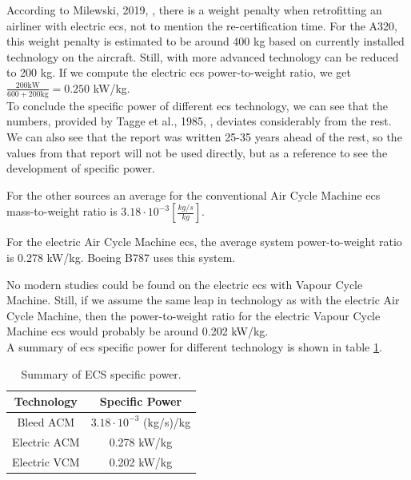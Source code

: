 \documentclass[english]{kththesis}
\begin{document}
According to Milewski, 2019, \cite{D.M.N.Milewski2019}, there is a weight penalty when retrofitting an airliner with electric \acrshort{ecs}, not to mention the re-certification time. For the A320, this weight penalty is estimated to be around 400 kg based on currently installed technology on the aircraft. Still, with more advanced technology can be reduced to 200 kg. If we compute the electric \acrshort{ecs} power-to-weight ratio, we get $\frac{200 \text{kW}}{600+200 \text{kg}}= 0.250$ kW/kg.\\

To conclude the specific power of different \acrshort{ecs} technology, we can see that the numbers, provided by Tagge et al., 1985, \cite{Tagge1985}, deviates considerably from the rest. We can also see that the report was written 25-35 years ahead of the rest, so the values from that report will not be used directly, but as a reference to see the development of specific power.

For the other sources an average for the conventional Air Cycle Machine \acrshort{ecs} mass-to-weight ratio is $3.18 \cdot 10 ^{-3} \left[\frac{kg/s}{kg}\right]$.

For the electric Air Cycle Machine \acrshort{ecs}, the average system power-to-weight ratio is 0.278 kW/kg. Boeing B787 uses this system.

No modern studies could be found on the electric \acrshort{ecs} with Vapour Cycle Machine. Still, if we assume the same leap in technology as with the electric Air Cycle Machine, then the power-to-weight ratio for the electric Vapour Cycle Machine \acrshort{ecs} would probably be around 0.202 kW/kg.\\

A summary of \acrshort{ecs} specific power for different technology is shown in table \ref{table:ECSSpecificPower}.

\begin{table}[h!]
\centering
\caption{Summary of ECS specific power.}
\begin{tabular}{| c | c |} 
\hline
Technology & Specific Power \\
\hline
Bleed ACM & $3.18 \cdot 10 ^{-3}$ (kg/s)/kg \\
Electric ACM & 0.278 kW/kg \\
Electric VCM & 0.202 kW/kg \\
\hline
\end{tabular}
\label{table:ECSSpecificPower}
\end{table}
\end{document}
